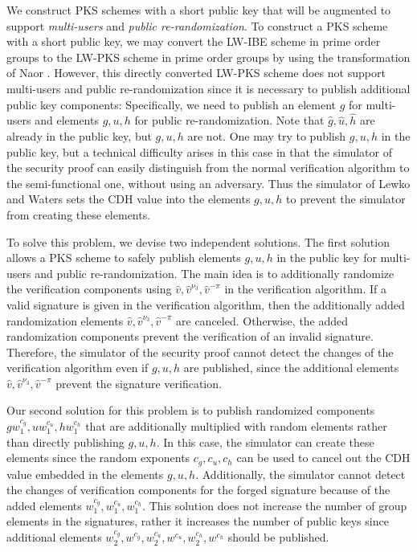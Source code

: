 \documentclass[11pt,letterpaper]{article}
\begin{document}
We construct PKS schemes with a short public key that will be augmented to
support \textit{multi-users} and \textit{public re-randomization}. To
construct a PKS scheme with a short public key, we may convert the LW-IBE
scheme \cite{LewkoW10} in prime order groups to the LW-PKS scheme in prime
order groups by using the transformation of Naor \cite{BonehF01}. However,
this directly converted LW-PKS scheme does not support multi-users and public
re-randomization since it is necessary to publish additional public key
components: Specifically, we need to publish an element $g$ for multi-users
and elements $g, u, h$ for public re-randomization. Note that $\hat{g},
\hat{u}, \hat{h}$ are already in the public key, but $g, u, h$ are not. One
may try to publish $g, u, h$ in the public key, but a technical difficulty
arises in this case in that the simulator of the security proof can easily
distinguish from the normal verification algorithm to the semi-functional
one, without using an adversary. Thus the simulator of Lewko and Waters sets
the CDH value into the elements $g, u, h$ to prevent the simulator from
creating these elements.

To solve this problem, we devise two independent solutions. The first
solution allows a PKS scheme to safely publish elements $g, u, h$ in the
public key for multi-users and public re-randomization. The main idea is to
additionally randomize the verification components using $\hat{v},
\hat{v}^{\nu_3}, \hat{v}^{-\pi}$ in the verification algorithm. If a valid
signature is given in the verification algorithm, then the additionally added
randomization elements $\hat{v}, \hat{v}^{\nu_3}, \hat{v}^{-\pi}$ are
canceled. Otherwise, the added randomization components prevent the
verification of an invalid signature. Therefore, the simulator of the
security proof cannot detect the changes of the verification algorithm even
if $g, u, h$ are published, since the additional elements $\hat{v},
\hat{v}^{\nu_3}, \hat{v}^{-\pi}$ prevent the signature verification.

Our second solution for this problem is to publish randomized components $g
w_1^{c_g}, u w_1^{c_u}, h w_1^{c_h}$ that are additionally multiplied with
random elements rather than directly publishing $g, u, h$. In this case, the
simulator can create these elements since the random exponents $c_g, c_u,
c_h$ can be used to cancel out the CDH value embedded in the elements $g, u,
h$. Additionally, the simulator cannot detect the changes of verification
components for the forged signature because of the added elements $w_1^{c_g},
w_1^{c_u}, w_1^{c_h}$. This solution does not increase the number of group
elements in the signatures, rather it increases the number of public keys
since additional elements $w_2^{c_g}, w^{c_g}, w_2^{c_u}, w^{c_u}, w_2^{c_h},
w^{c_h}$ should be published.
\end{document}
